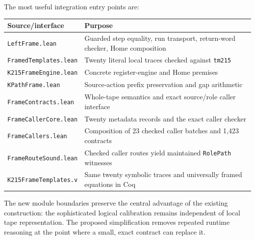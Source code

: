 \documentclass[11pt]{article}
\theoremstyle{definition}\newtheorem{definition}[theorem]{Definition}
\theoremstyle{remark}\newtheorem{remark}[theorem]{Remark}
\newcommand{\code}[1]{\nolinkurl{#1}}
\begin{document}
The most useful integration entry points are:
\begin{center}
\begin{tabular}{>{\raggedright\arraybackslash}p{.43\linewidth}>{\raggedright\arraybackslash}p{.47\linewidth}}
\toprule
Source/interface & Purpose\\
\midrule
\code{LeftFrame.lean} & Guarded step equality, run transport, return-word checker, Home composition\\
\code{FramedTemplates.lean} & Twenty literal local traces checked against \code{tm215}\\
\code{K215FrameEngine.lean} & Concrete register-engine and Home premises\\
\code{KPathFrame.lean} & Source-action prefix preservation and gap arithmetic\\
\code{FrameContracts.lean} & Whole-tape semantics and exact source/role caller interface\\
\code{FrameCallerCore.lean} & Twenty metadata records and the exact caller checker\\
\code{FrameCallers.lean} & Composition of 23 checked caller batches and 1,423 contracts\\
\code{FrameRouteSound.lean} & Checked caller routes yield maintained \code{RolePath} witnesses\\
\code{K215FrameTemplates.v} & Same twenty symbolic traces and universally framed equations in Coq\\
\bottomrule
\end{tabular}
\end{center}

The new module boundaries preserve the central advantage of the existing construction: the sophisticated logical calibration remains independent of local tape representation. The proposed simplification removes repeated runtime reasoning at the point where a small, exact contract can replace it.
\end{document}
